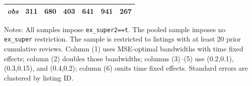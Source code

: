 \begin{table}[!htbp]
\begin{tabular}{lcccccc}
\textit{obs} & 311 & 680 & 403 & 641 & 941 & 267 \\
\bottomrule
\end{tabular}
\begin{minipage}{0.98\textwidth}\footnotesize
Notes: All samples impose \texttt{ex\_super2==t}. The pooled sample imposes no \texttt{ex\_super} restriction. The sample is restricted to listings with at least 20 prior cumulative reviews. Column (1) uses MSE-optimal bandwidths with time fixed effects; column (2) doubles those bandwidths; columns (3)--(5) use (0.2,0.1), (0.3,0.15), and (0.4,0.2); column (6) omits time fixed effects. Standard errors are clustered by listing ID.
\end{minipage}
\end{table}
